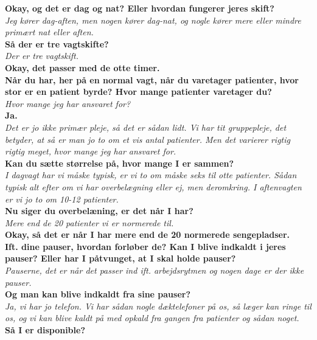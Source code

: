 \noindent
\textbf{Okay, og det er dag og nat? Eller hvordan fungerer jeres skift?} \\
\noindent
\textit{Jeg kører dag-aften, men nogen kører dag-nat, og nogle kører mere eller mindre primært nat eller aften.} \\
\noindent
\textbf{Så der er tre vagtskifte?} \\
\noindent
\textit{Der er tre vagtskift.} \\
\noindent
\textbf{Okay, det passer med de otte timer.} \\
\noindent
\textbf{Når du har, her på en normal vagt, når du varetager patienter, hvor stor er en patient byrde? Hvor mange patienter varetager du?} \\
\noindent
\textit{Hvor mange jeg har ansvaret for?} \\
\noindent
\textbf{Ja.} \\
\noindent
\textit{Det er jo ikke primær pleje, så det er sådan lidt. Vi har tit gruppepleje, det betyder, at så er man jo to om et vis antal patienter. Men det varierer rigtig rigtig meget, hvor mange jeg har ansvaret for.} \\
\noindent
\textbf{Kan du sætte størrelse på, hvor mange I er sammen?} \\
\noindent
\textit{I dagvagt har vi måske typisk, er vi to om måske seks til otte patienter. Sådan typisk alt efter om vi har overbelægning eller ej, men deromkring. I aftenvagten er vi jo to om 10-12 patienter.} \\
\noindent
\textbf{Nu siger du overbelæning, er det når I har?} \\
\noindent
\textit{Mere end de 20 patienter vi er normerede til.} \\
\noindent
\textbf{Okay, så det er når I har mere end de 20 normerede sengepladser.} \\
\noindent
\textbf{Ift. dine pauser, hvordan forløber de? Kan I blive indkaldt i jeres pauser? Eller har I påtvunget, at I skal holde pauser?} \\
\noindent
\textit{Pauserne, det er når det passer ind ift. arbejdsrytmen og nogen dage er der ikke pauser.} \\
\noindent
\textbf{Og man kan blive indkaldt fra sine pauser?} \\
\noindent
\textit{Ja, vi har jo telefon. Vi har sådan nogle dæktelefoner på os, så læger kan ringe til os, og vi kan blive kaldt på med opkald fra gangen fra patienter og sådan noget.}\\ 
\noindent
\textbf{Så I er disponible?} \\
